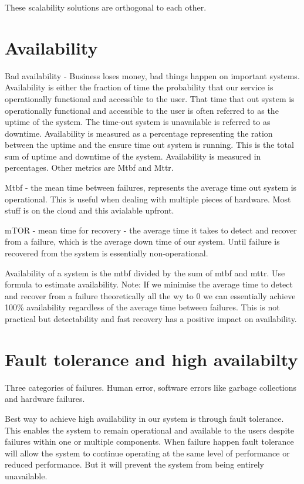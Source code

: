 \documentclass[a4paper, 11pt]{book}
\begin{document}
    These scalability solutions are orthogonal to each other.


    \section{Availability}
    Bad availability - Business loses money, bad things happen on important systems.
    Availability is either the fraction of time the probability that our service is operationally functional and accessible to the user.
    That time that out system is operationally functional and accessible to the user is often referred to as the uptime of the system.
    The time-out system is unavailable is referred to as downtime.
    Availability is measured as a percentage representing the ration between the uptime and the ensure time out system is running.
    This is the total sum of uptime and downtime of the system.
    Availability is measured in percentages.
    Other metrics are Mtbf and Mttr.

    Mtbf - the mean time between failures, represents the average time out system is operational.
    This is useful when dealing with multiple pieces of hardware. Most stuff is on the cloud and this avialable upfront.

    mTOR - mean time for recovery - the average time it takes to detect and recover from a failure, which is the average down time of our system.
    Until failure is recovered from the system is essentially non-operational.

    Availability of a system is the mtbf divided by the sum of mtbf and mttr.
    Use formula to estimate availability.
    Note: If we minimise the average time to detect and recover from a failure theoretically all the wy to 0 we can essentially achieve 100\%
    availability regardless of the average time between failures.
    This is not practical but detectability and fast recovery has a positive impact on availability.


    \section{Fault tolerance and high availabilty}
    Three categories of failures.
    Human error, software errors like garbage collections and hardware failures.

    Best way to achieve high availability in our system is through fault tolerance.
    This enables the system to remain operational and available to the users despite failures within one or multiple components.
    When failure happen fault tolerance will allow the system to continue operating at the same level of performance or reduced performance.
    But it will prevent the system from being entirely unavailable.
\end{document}
